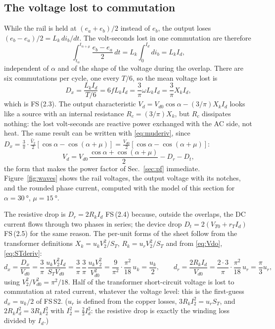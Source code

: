 \documentclass[10pt,a4paper]{scrartcl}
\newcommand{\Vdo}{V_{d0}}
\newcommand{\Vd}{V_{d}}
\newcommand{\Id}{I_{d}}
\newcommand{\Vll}{V_{2}}
\newcommand{\Xk}{X_{k}}
\newcommand{\Lk}{L_{k}}
\newcommand{\Rk}{R_{k}}
\newcommand{\uk}{u_{k}}
\newcommand{\ur}{u_{r}}
\newcommand{\Dx}{D_{x}}
\newcommand{\Dr}{D_{r}}
\newcommand{\Dt}{D_{t}}
\newcommand{\fs}[1]{\textsf{FS}\,(#1)}
\newcommand{\fsS}[1]{\textsf{FS}\,#1}
\begin{document}
\subsection{The voltage lost to commutation}\label{sec:Dx}
While the rail is held at $(e_a+e_b)/2$ instead of $e_b$, the output loses $(e_b-e_a)/2 = \Lk\,di_b/dt$. The volt-seconds lost in one commutation are therefore
\begin{equation}
\int_{t_\alpha}^{t_{\alpha+\mu}}\frac{e_b-e_a}{2}\,dt = \Lk\int_0^{\Id}di_b = \Lk\Id ,
\label{eq:voltsec}
\end{equation}
independent of $\alpha$ and of the shape of the voltage during the overlap. There are six commutations per cycle, one every $T/6$, so the mean voltage lost is
\begin{equation}
\Dx = \frac{\Lk\Id}{T/6} = 6f\Lk\Id = \frac{3}{\pi}\omega\Lk\Id = \frac{3}{\pi}\Xk\Id ,
\label{eq:Dxderiv}
\end{equation}
which is \fs{2.3}. The output characteristic $\Vd = \Vdo\cos\alpha - (3/\pi)\Xk\Id$ looks like a source with an internal resistance $R_c = (3/\pi)\Xk$, but $R_c$ dissipates nothing: the lost volt-seconds are reactive power exchanged with the AC side, not heat. The same result can be written with \eqref{eq:muderiv}, since $\Dx = \tfrac{3}{\pi}\cdot\tfrac{\hat V_2}{2}[\cos\alpha-\cos(\alpha+\mu)] = \tfrac{\Vdo}{2}[\cos\alpha-\cos(\alpha+\mu)]$:
\begin{equation}
\Vd = \Vdo\,\frac{\cos\alpha+\cos(\alpha+\mu)}{2} - \Dr - \Dt ,
\label{eq:Vdmu}
\end{equation}
the form that makes the power factor of Sec.~\ref{sec:pf} immediate. Figure~\ref{fig:waves} shows the rail voltages, the output voltage with its notches, and the rounded phase current, computed with the model of this section for $\alpha = \SI{30}{\degree}$, $\mu = \SI{15}{\degree}$.

The resistive drop is $\Dr = 2\Rk\Id$ \fs{2.4} because, outside the overlaps, the DC current flows through two phases in series; the device drop $\Dt = 2(V_{T0}+r_T\Id)$ \fs{2.5} for the same reason. The per-unit forms of the sheet follow from the transformer definitions $\Xk = \uk\Vll^2/S_T$, $\Rk = \ur\Vll^2/S_T$ and from \eqref{eq:Vdo}, \eqref{eq:STderiv}:
\begin{equation}
d_x = \frac{\Dx}{\Vdo} = \frac{3}{\pi}\,\frac{\uk\Vll^2\Id}{S_T\Vdo} = \frac{3}{\pi}\,\frac{3}{\pi}\,\frac{\uk\Vll^2}{\Vdo^2} = \frac{9}{\pi^2}\cdot\frac{\pi^2}{18}\,\uk = \frac{\uk}{2}, \qquad
d_r = \frac{2\Rk\Id}{\Vdo} = \frac{2\cdot3}{\pi}\cdot\frac{\pi^2}{18}\,\ur = \frac{\pi}{3}\ur ,
\label{eq:dxdr}
\end{equation}
using $\Vll^2/\Vdo^2 = \pi^2/18$. Half of the transformer short-circuit voltage is lost to commutation at rated current, whatever the voltage level: this is the first-guess $d_x = \uk/2$ of \fsS{S2}. ($\ur$ is defined from the copper losses, $3\Rk I_2^2 = \ur S_T$, and $2\Rk\Id^2 = 3\Rk I_2^2$ with $I_2^2 = \tfrac23\Id^2$: the resistive drop is exactly the winding loss divided by $\Id$.)
\end{document}
